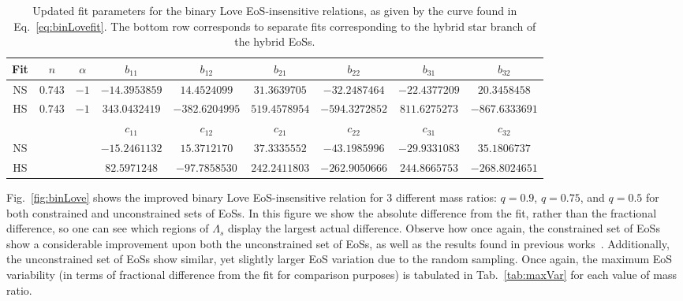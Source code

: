 \documentclass[prd,twocolumn,nofootinbib,superscriptaddress,amsmath,amssymb]{revtex4-1}
\begin{document}
\begin{table*}
\centering
\caption{
Updated fit parameters for the binary Love EoS-insensitive relations, as given by the curve found in Eq.~\ref{eq:binLovefit}.
The bottom row corresponds to separate fits corresponding to the hybrid star branch of the hybrid EoSs.
}\label{tab:binLovefit}
\addtolength{\tabcolsep}{1pt} 
\begin{tabular}{c | c  c  c  c  c  c  c  c } 
 \hline
 \hline
 Fit & $n$ & $\alpha$ & $b_{11}$ & $b_{12}$ & $b_{21}$ & $b_{22}$ & $b_{31}$ & $b_{32}$\\
 \hline
 NS & $0.743$ & $-1$ & $-14.3953859$ & $14.4524099$ & $31.3639705$ & $-32.2487464$ & $-22.4377209$ & $20.3458458$\\
 HS & $0.743$ & $-1$ & $343.0432419$ & $-382.6204995$ & $519.4578954$ & $-594.3272852$ & $811.6275273$ & $-867.6333691$\\
\hline
 \hline
 \noalign{\smallskip}

 & & & $c_{11}$ & $c_{12}$ & $c_{21}$ & $c_{22}$ & $c_{31}$ & $c_{32}$\\
 \hline
 NS & & & $-15.2461132$ & $15.3712170$ & $37.3335552$ & $-43.1985996$ & $-29.9331083$ & $35.1806737$\\
 HS & & & $82.5971248$ & $-97.7858530$ & $242.2411803$ & $-262.9050666$ & $244.8665753$ & $-268.8024651$\\
 \hline
 \hline
\end{tabular}
\addtolength{\tabcolsep}{-1pt}
\end{table*}

Fig.~\ref{fig:binLove} shows the improved binary Love EoS-insensitive relation for 3 different mass ratios: $q=0.9$, $q=0.75$, and $q=0.5$ for both constrained and unconstrained sets of EoSs.
In this figure we show the absolute difference from the fit, rather than the fractional difference, so one can see which regions of $\Lambda_s$ display the largest actual difference.
Observe how once again, the constrained set of EoSs show a considerable improvement upon both the unconstrained set of EoSs, as well as the results found in previous works~\cite{Yagi:binLove}.
Additionally, the unconstrained set of EoSs show similar, yet slightly larger EoS variation due to the random sampling.
Once again, the maximum EoS variability (in terms of fractional difference from the fit for comparison purposes) is tabulated in Tab.~\ref{tab:maxVar} for each value of mass ratio.
\end{document}

